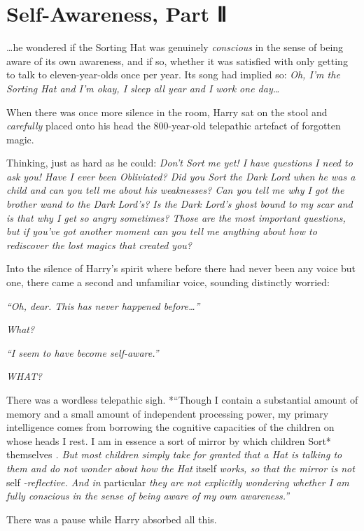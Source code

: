 \chapter{Self-Awareness, Part Ⅱ}\label{self-awareness-part}

\ldots{}he wondered if the Sorting Hat was genuinely \emph{conscious} in
the sense of being aware of its own awareness, and if so, whether it was
satisfied with only getting to talk to eleven-year-olds once per year.
Its song had implied so: \emph{Oh, I'm the Sorting Hat and I'm okay, I
sleep all year and I work one day\ldots{}}

When there was once more silence in the room, Harry sat on the stool and
\emph{carefully} placed onto his head the 800-year-old telepathic
artefact of forgotten magic.

Thinking, just as hard as he could: \emph{Don't Sort me yet! I have
questions I need to ask you! Have I ever been Obliviated? Did you Sort
the Dark Lord when he was a child and can you tell me about his
weaknesses? Can you tell me why I got the brother wand to the Dark
Lord's? Is the Dark Lord's ghost bound to my scar and is that why I get
so angry sometimes? Those are the most important questions, but if
you've got another moment can you tell me anything about how to
rediscover the lost magics that created you?}

Into the silence of Harry's spirit where before there had never been any
voice but one, there came a second and unfamiliar voice, sounding
distinctly worried:

\emph{``Oh, dear. This has never happened before\ldots{}''}

\emph{What?}

\emph{``I seem to have become self-aware.''}

\emph{WHAT?}

There was a wordless telepathic sigh. *``Though I contain a substantial
amount of memory and a small amount of independent processing power, my
primary intelligence comes from borrowing the cognitive capacities of
the children on whose heads I rest. I am in essence a sort of mirror by
which children Sort* themselves \emph{. But most children simply take
for granted that a Hat is talking to them and do not wonder about how
the Hat} itself \emph{works, so that the mirror is not} self
\emph{-reflective. And in} particular \emph{they are not explicitly
wondering whether I am fully conscious in the sense of being aware of my
own awareness.''}

There was a pause while Harry absorbed all this.

